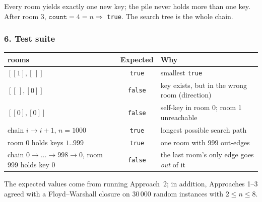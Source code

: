 \begin{tracebox}
\begin{center}
\end{center}
Every room yields exactly one new key; the pile never holds more than one key. After room 3, $\texttt{count} = 4 = n \Rightarrow$ \texttt{true}. The search tree is the whole chain.
\end{tracebox}

\subsubsection*{6. Test suite}

\begin{testbox}
\centering\small
\begin{tabular}{@{}p{6.4cm}cp{5.2cm}@{}}
\toprule
\textbf{rooms} & \textbf{Expected} & \textbf{Why} \\
\midrule
$[[1],[\,]]$ & \texttt{true} & smallest \texttt{true} \\
$[[\,],[0]]$ & \texttt{false} & key exists, but in the wrong room (direction) \\
$[[0],[0]]$ & \texttt{false} & self-key in room 0; room 1 unreachable \\
chain $i \to i+1$, $n = 1000$ & \texttt{true} & longest possible search path \\
room 0 holds keys $1..999$ & \texttt{true} & one room with 999 out-edges \\
chain $0 \to \dots \to 998 \to 0$, room 999 holds key 0 & \texttt{false} & the last room's only edge goes \emph{out} of it \\
\bottomrule
\end{tabular}
\end{testbox}
The expected values come from running Approach~2; in addition, Approaches 1--3 agreed with a Floyd--Warshall closure on 30\,000 random instances with $2 \le n \le 8$.

